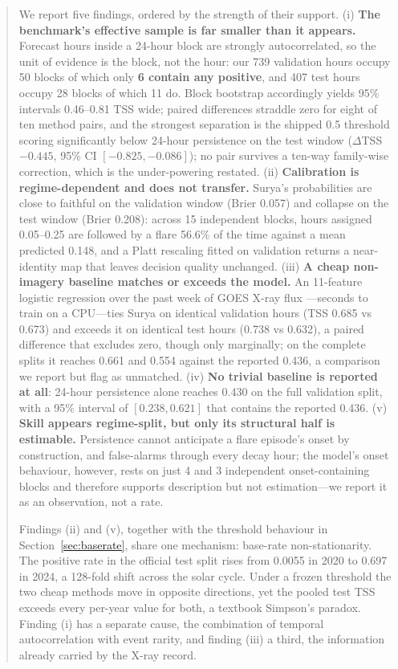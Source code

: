 \documentclass[11pt]{article}
\begin{document}
\begin{abstract}
We report five findings, ordered by the strength of their support.
(i) \textbf{The benchmark's effective sample is far smaller than it appears.}
Forecast hours inside a 24-hour block are strongly autocorrelated, so the unit of
evidence is the block, not the hour: our 739 validation hours occupy 50 blocks of
which only \textbf{6 contain any positive}, and 407 test hours occupy 28 blocks of
which 11 do. Block bootstrap accordingly yields 95\% intervals 0.46--0.81 TSS
wide; paired differences straddle zero for eight of ten method pairs, and
the strongest separation is the shipped 0.5 threshold scoring significantly
below 24-hour persistence on the test window ($\Delta$TSS $-0.445$, 95\% CI
$[-0.825, -0.086]$); no pair survives a ten-way family-wise correction, which
is the under-powering restated.
(ii) \textbf{Calibration is regime-dependent and does not transfer.} Surya's
probabilities are close to faithful on the validation window (Brier 0.057) and
collapse on the test window (Brier 0.208): across 15 independent blocks, hours
assigned 0.05--0.25 are followed by a flare 56.6\% of the time against a mean
predicted 0.148, and a Platt rescaling fitted on validation returns a
near-identity map that leaves decision quality unchanged.
(iii) \textbf{A cheap non-imagery baseline matches or exceeds the model.} An 11-feature logistic regression over the past week of GOES X-ray flux
---seconds to train on a CPU---ties Surya on identical validation hours (TSS
0.685 vs 0.673) and exceeds it on identical test hours (0.738 vs 0.632), a paired
difference that excludes zero, though only marginally; on the complete splits it reaches 0.661 and 0.554 against the reported 0.436, a
comparison we report but flag as unmatched.
(iv) \textbf{No trivial baseline is reported at all}: 24-hour persistence alone
reaches 0.430 on the full validation split, with a 95\% interval of
$[0.238, 0.621]$ that contains the reported 0.436.
(v) \textbf{Skill appears regime-split, but only its structural half is
estimable.} Persistence cannot anticipate a flare episode's onset by
construction, and false-alarms through every decay hour; the model's onset
behaviour, however, rests on just 4 and 3 independent onset-containing blocks and
therefore supports description but not estimation---we report it as an
observation, not a rate.

Findings (ii) and (v), together with the threshold behaviour in
Section~\ref{sec:baserate}, share one mechanism: base-rate non-stationarity. The
positive rate in the official test split rises from 0.0055 in 2020 to 0.697 in
2024, a 128-fold shift across the solar cycle. Under a frozen threshold the two cheap
methods move in opposite directions, yet the pooled test TSS exceeds every
per-year value for both, a textbook Simpson's paradox. Finding (i) has a separate cause, the
combination of temporal autocorrelation with event rarity, and finding (iii) a
third, the information already carried by the X-ray record.


\end{abstract}
\end{document}
